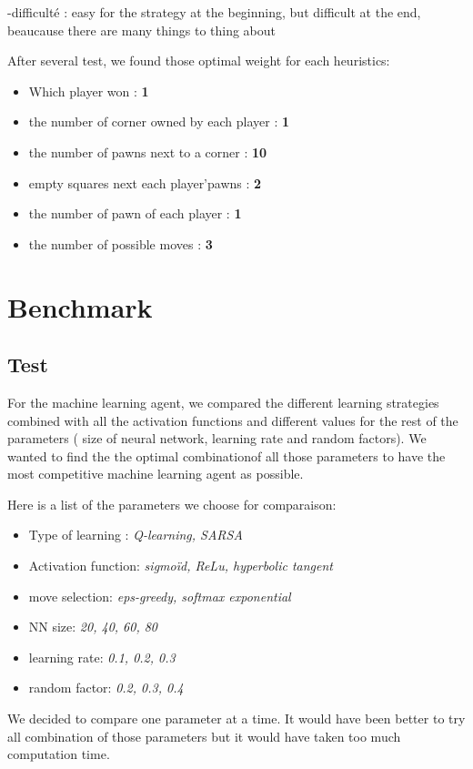 \documentclass{article}
\begin{document}
-difficulté : easy for the strategy at the beginning, but difficult at the end, beaucause there are many things to thing about

 \newline
 After several test, we found those optimal weight for each heuristics:
\begin{itemize}
    \item Which player won : \textbf{1}
    \item the number of corner owned by each player : \textbf{1}
    \item the number of pawns next to a corner : \textbf{10}
    \item empty squares next each player'pawns : \textbf{2}
    \item the number of pawn of each player : \textbf{1}
    \item the number of possible moves : \textbf{3}
\end{itemize}


\section{Benchmark} \label{sec:benchmark}

\subsection{Test}
For the machine learning agent, we compared the different learning strategies combined with all the activation functions and different values for the rest of the parameters ( size of neural network, learning rate and random factors). We wanted to find the the optimal combinationof all those parameters to have the most competitive machine learning agent as possible.

Here is a list of the parameters we choose for comparaison:
\begin{itemize}
    \item Type of learning : \textit{ Q-learning, SARSA}
    \item Activation function: \textit{sigmoïd, ReLu, hyperbolic tangent}
    \item move selection: \textit{eps-greedy, softmax exponential}
    \item NN size: \textit{20, 40, 60, 80}
    \item learning rate: \textit{0.1, 0.2, 0.3}
    \item random factor: \textit{0.2, 0.3, 0.4}
\end{itemize}
We decided to compare one parameter at a time. It would have been better to try all combination of those parameters but it would have taken too much computation time. \\
\end{document}
